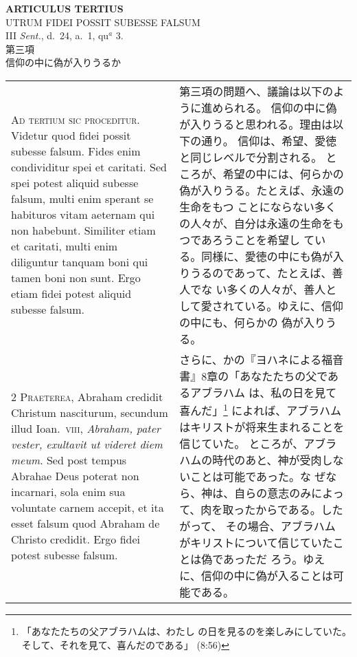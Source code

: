 \documentclass[10pt]{jsarticle} %
\begin{document}
\begin{center}
 {\Large {\bf ARTICULUS TERTIUS}}\\
 {\large UTRUM FIDEI POSSIT SUBESSE FALSUM}\\
 {\footnotesize III {\itshape Sent.}, d.~24, a.~1, qu$^a$ 3.}\\
 {\Large 第三項\\信仰の中に偽が入りうるか}
\end{center}

\begin{longtable}{p{21em}p{21em}}

{\huge A}{\scshape d tertium sic proceditur}. Videtur
quod fidei possit subesse falsum. Fides enim condividitur spei et
caritati. Sed spei potest aliquid subesse falsum, multi enim sperant se
habituros vitam aeternam qui non habebunt. Similiter etiam et caritati,
multi enim diliguntur tanquam boni qui tamen boni non sunt. Ergo etiam
fidei potest aliquid subesse falsum.


&

第三項の問題へ、議論は以下のように進められる。
信仰の中に偽が入りうると思われる。理由は以下の通り。
信仰は、希望、愛徳と同じレベルで分割される。
ところが、希望の中には、何らかの偽が入りうる。たとえば、永遠の生命をもつ
 ことにならない多くの人々が、自分は永遠の生命をもつであろうことを希望し
 ている。同様に、愛徳の中にも偽が入りうるのであって、たとえば、善人でな
 い多くの人々が、善人として愛されている。ゆえに、信仰の中にも、何らかの
 偽が入りうる。

\\


{\scshape 2 Praeterea}, Abraham credidit Christum nasciturum, secundum
illud Ioan.~{\scshape viii}, {\itshape Abraham, pater vester, exultavit
ut videret diem meum}. Sed post tempus Abrahae Deus poterat non
incarnari, sola enim sua voluntate carnem accepit, et ita esset falsum
quod Abraham de Christo credidit. Ergo fidei potest subesse falsum.


&

さらに、かの『ヨハネによる福音書』8章の「あなたたちの父であるアブラハム
 は、私の日を見て喜んだ」\footnote{「あなたたちの父アブラハムは、わたし
 の日を見るのを楽しみにしていた。そして、それを見て、喜んだのである」
 (8:56)}
によれば、アブラハムはキリストが将来生まれることを信じていた。
ところが、アブラハムの時代のあと、神が受肉しないことは可能であった。な
 ぜなら、神は、自らの意志のみによって、肉を取ったからである。したがって、
 その場合、アブラハムがキリストについて信じていたことは偽であっただ
 ろう。ゆえに、信仰の中に偽が入ることは可能である。


\end{longtable}
\end{document}
